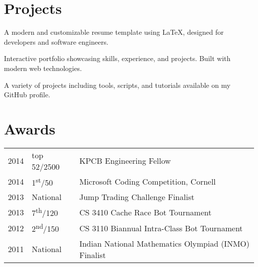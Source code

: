 \documentclass[]{azhagu-swe-resume-openfont}
\begin{document}
\begin{minipage}[t]{0.66\textwidth}

\section{Projects}

A modern and customizable resume template using LaTeX, designed for developers and software engineers.
\sectionsep

Interactive portfolio showcasing skills, experience, and projects. Built with modern web technologies.
\sectionsep

A variety of projects including tools, scripts, and tutorials available on my GitHub profile.


\section{Awards} 
\begin{tabular}{rll}
2014	     & top 52/2500  & KPCB Engineering Fellow\\
2014	     & 1\textsuperscript{st}/50  & Microsoft Coding Competition, Cornell\\
2013	     & National  & Jump Trading Challenge Finalist\\
2013     & 7\textsuperscript{th}/120 & CS 3410 Cache Race Bot Tournament  \\
2012     & 2\textsuperscript{nd}/150 & CS 3110 Biannual Intra-Class Bot Tournament \\
2011     & National & Indian National Mathematics Olympiad (INMO) Finalist \\
\end{tabular}
\sectionsep

\end{minipage} 
\end{document}
